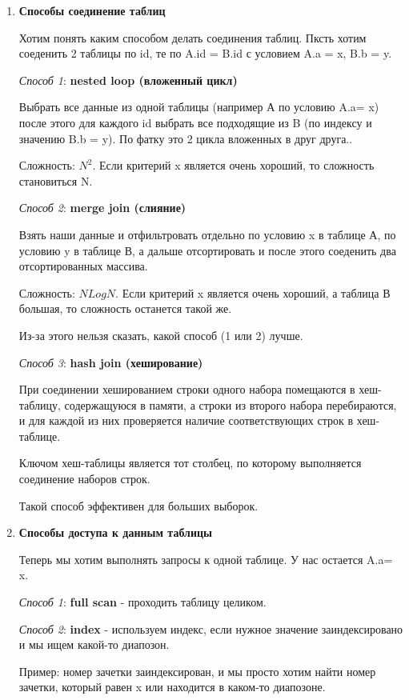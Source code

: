 \begin{enumerate}
    \item \textbf{Способы соединение таблиц }

Хотим понять каким способом делать соединения таблиц. Пксть хотим соеденить 2 таблицы по id, те по A.id = B.id с условием A.a = x, B.b = y.

\textit{Способ 1}: \textbf{nested loop (вложенный цикл)}

Выбрать все данные из одной таблицы (например А по условию A.a= x) после этого для каждого id выбрать все подходящие из B (по индексу и значению B.b = y). По фатку это 2 цикла вложенных в друг друга..

Сложность: $N^2$. Если критерий x является очень хороший, то сложность становиться N. 

\textit{Способ 2}: \textbf{merge join (слияние)}

Взять наши данные и отфильтровать отдельно по условию x в таблице А, по условию y в таблице В, а дальше отсортировать и после этого соеденить два отсортированных массива.

Сложность: $NLogN$. Если критерий x является очень хороший, а таблица В большая, то сложность останется такой же. 

Из-за этого нельзя сказать, какой способ (1 или 2) лучше. 

\textit{Способ 3}: \textbf{hash join (хеширование)}

При соединении хешированием строки одного набора помещаются в
хеш-таблицу, содержащуюся в памяти, а строки из второго набора
перебираются, и для каждой из них проверяется наличие
соответствующих строк в хеш-таблице.

Ключом хеш-таблицы является тот столбец, по которому выполняется
соединение наборов строк.

Такой способ эффективен для больших выборок. 

\item  \textbf{Способы доступа к данным таблицы}

Теперь мы хотим выполнять запросы к одной таблице. У нас остается A.a= x. 

\textit{Способ 1}: \textbf{full scan} - проходить таблицу целиком. 

\textit{Способ 2}: \textbf{index} - используем индекс, если нужное значение заиндексировано и мы ищем какой-то диапозон. 

Пример: номер зачетки заиндексирован, и мы просто хотим найти номер зачетки, который равен x или находится в каком-то диапозоне. 


\end{enumerate}
